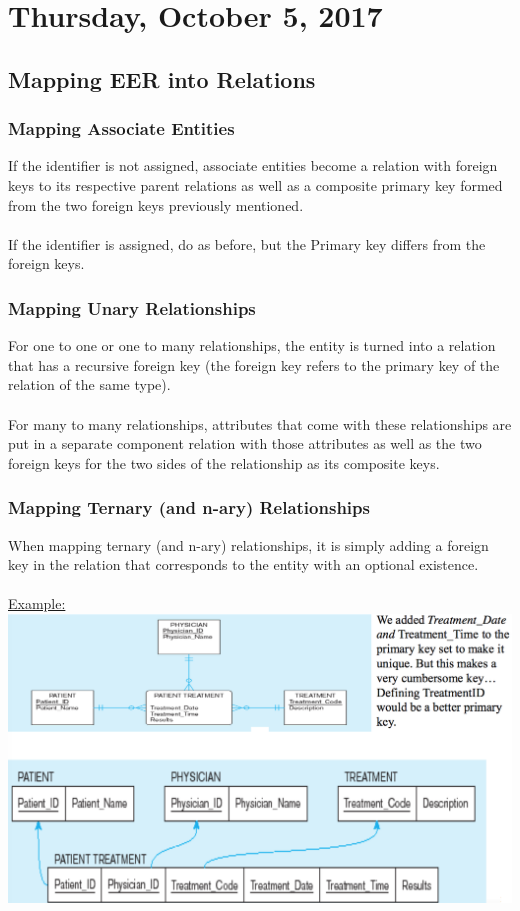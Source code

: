 \documentclass[12pt]{article}
\begin{document}
\newpage

\section{Thursday, October 5, 2017}

\subsection{Mapping EER into Relations}

\subsubsection{Mapping Associate Entities}

If the identifier is not assigned, associate entities become a relation with foreign keys to its respective parent relations as well as a composite primary key formed from the two foreign keys previously mentioned.\\
\\
If the identifier is assigned, do as before, but the Primary key differs from the foreign keys.

\subsubsection{Mapping Unary Relationships}

For one to one or one to many relationships, the entity is turned into a relation that has a recursive foreign key (the foreign key refers to the primary key of the relation of the same type).\\
\\
For many to many relationships, attributes that come with these relationships are put in a separate component relation with those attributes as well as the two foreign keys for the two sides of the relationship as its composite keys.

\subsubsection{Mapping Ternary (and n-ary) Relationships}

When mapping ternary (and n-ary) relationships, it is simply adding a foreign key in the relation that corresponds to the entity with an optional existence.\\
\\
\underline{Example:}\\
\includegraphics[scale=0.5]{lec5-1}
\end{document}
